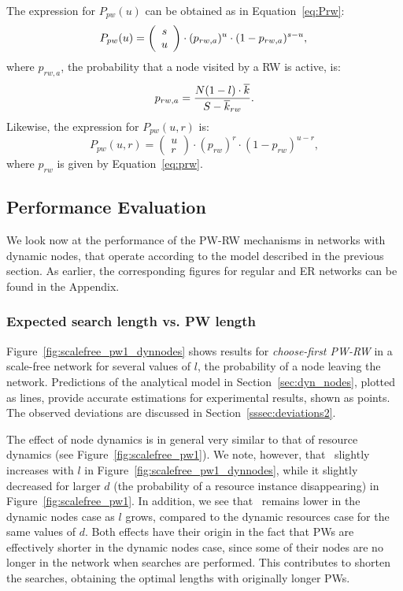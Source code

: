 \documentclass[]{elsarticle}
\newcommand{\PWx}[1]    {\ensuremath{P_{pw}(#1)}}
\begin{document}
The expression for $\PWx{u}$ can be obtained as in Equation~\ref{eq:Prw}:
\begin{equation}
 \PWx{u}   = \left(\begin{array}{c} s\\ u \end{array}\right) \cdot (p_{rw,a})^u \cdot (1-p_{rw,a})^{s-u}, \nonumber \\
 \label{eq:Prw2}
\end{equation}
where $p_{rw,a}$, the probability that a node visited by a RW is active, is:
\begin{equation}
 p_{rw,a} = \frac{N(1-l)\cdot\overline{k}}{S-\overline{k}_{rw}}.
 \label{eq:prwa}
\end{equation}
Likewise, the expression for $\PWx{u,r}$ is:
\begin{equation}
 \PWx{u,r} = \left(\begin{array}{c} u\\ r \end{array}\right) \cdot (p_{rw})^r \cdot (1-p_{rw})^{u-r},
 \label{eq:Prw3}
\end{equation}
where $p_{rw}$ is given by Equation~\ref{eq:prw}.



\subsection{Performance Evaluation}
We look now at the performance of the PW-RW mechanisms in networks with dynamic nodes, that operate according to the model described in the previous section. As earlier, the corresponding figures for regular and ER networks can be found in the Appendix. \\

\subsubsection{Expected search length vs. PW length}

Figure~\ref{fig:scalefree_pw1_dynnodes} shows results for \emph{choose-first PW-RW} in a scale-free network for several values of $l$, the probability of a node leaving the network. Predictions of the analytical model in Section~\ref{sec:dyn_nodes}, plotted as lines, provide accurate estimations for experimental results, shown as points.
The observed deviations are discussed in Section~\ref{sssec:deviations2}. 


The effect of node dynamics is in general very similar to that of resource dynamics (see Figure~\ref{fig:scalefree_pw1}). We note, however, that \sopt\ slightly increases with $l$ in Figure~\ref{fig:scalefree_pw1_dynnodes}, while it slightly decreased for larger $d$ (the probability of a resource instance disappearing) in Figure~\ref{fig:scalefree_pw1}. In addition, we see that \Lexpopt\ remains lower in the dynamic nodes case as $l$ grows, compared to the dynamic resources case for the same values of $d$. Both effects have their origin in the fact that PWs are effectively shorter in the dynamic nodes case, since some of their nodes are no longer in the network when searches are performed. This contributes to shorten the searches, obtaining the optimal lengths with originally longer PWs.
\end{document}
